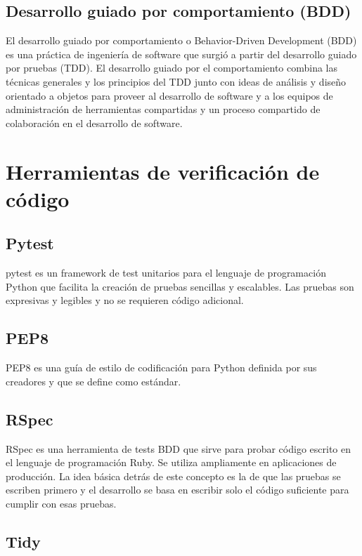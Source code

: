 \subsection {Desarrollo guiado por comportamiento (BDD)}

El desarrollo guiado por comportamiento o Behavior-Driven Development (BDD) es una práctica de ingeniería de software que surgió a partir del desarrollo guiado por pruebas (TDD). El desarrollo guiado por el comportamiento combina las técnicas generales y los principios del TDD junto con ideas de análisis y diseño orientado a objetos para proveer al desarrollo de software y a los equipos de administración de herramientas compartidas y un proceso compartido de colaboración en el desarrollo de software.


\section {Herramientas de verificación de código}

\subsection {Pytest}

pytest es un framework de test unitarios para el lenguaje de programación Python que facilita la creación de pruebas sencillas y escalables. Las pruebas son expresivas y legibles y no se requieren código adicional.

\subsection {PEP8}

PEP8 es una guía de estilo de codificación para Python definida por sus creadores y que se define como estándar.

\subsection {RSpec}

RSpec es una herramienta de tests BDD que sirve para probar código escrito en el lenguaje de programación Ruby. Se utiliza ampliamente en aplicaciones de producción. La idea básica detrás de este concepto es la de que las pruebas se escriben primero y el desarrollo se basa en escribir solo el código suficiente para cumplir con esas pruebas.

\subsection {Tidy}

